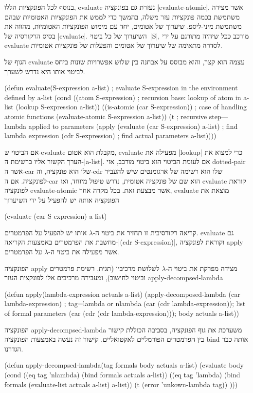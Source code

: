 בנוסף לכל הפונקציות הללו, evaluate נעזרת גם בפונקציה \E|evaluate-atomic|, אשר
מצידה משתמשת בכמה פונקציות עזר משלה, בהמשך כדי לממש את הפונקציות האטומיות שבהם
משתמשת מיני-ליספ. שיערוך של אטומים, יחד עם מימוש הפונקציות האטומיות, מהווה את
בסיס הרקורסיה של \E|evaluate|. השיערוך של כל ביטוי~\E|S|, מורכב ככל שיהיה
מתורגם על ידי evaluate לסדרה מתאימה של שיערוך של אטומים והפעלות של פונקציות
אטומיות.

הגוף של evaluate עצמה הוא קצר, והוא מבוסס על אבחנה בין שלוש אפשרויות שונות ביחס
לביטוי אותו היא נדרש לשערך.

\minipage\textwidth
\begin{KERNEL}
(defun evaluate(S-expression a-list) ; evaluate S-expression in the environment defined by a-list
  (cond ((atom S-expression) ; recursion base: lookup of atom in a-list
          (lookup S-expression a-list))
        ((is-atomic (car S-expression)) ; case of handling atomic functions
          (evaluate-atomic S-expression a-list))
        (t ; recursive step---lambda applied to parameters
          (apply (evaluate (car S-expression) a-list) ; find lambda expression
                  (cdr S-expression) ; find actual parameters
                  a-list))))
\end{KERNEL}
\endminipage

אם הביטוי ש-evaluate מקבלת הוא אטום, evaluate מפעילה את \E|lookup| כדי למצוא את
הערך הקשור אליו ברשימת ה-\E|a-list|. אם לעומת הביטוי הוא ביטוי מורכב, אזי
dotted-pair אשר ה-car שלו הוא פונקציה, וה-cdr שלו הוא רשימה של
ארגומנטים שיש להעביר לפונקציה. אם ה-car הוא שם של פונקציה אטומית, נדרש טיפול
מיוחד, ואז evaluate קוראת לפונקציה evaluate-atomic אשר מבצעת זאת.
בכל מקרה אחר, evaluate מוצאת את הפונקציה אותה יש להפעיל על ידי השיערוך
\begin{LISP}
(evaluate (car S-expression) a-list)
\end{LISP}
קריאה רקורסיבית זו תחזיר את ביטוי ה-$λ$ אותו יש להפעיל על הפרמטרים. evaluate
גם מחשבת את הפרמטרים באמצעות הקריאה-\T|(cdr S-expression)|, וקוראת לפונקציה
apply אשר מפעילה את ביטוי ה-$λ$ על הפרמטרים.

הפונקציה apply מצידה מפרקת את ביטוי ה-$λ$ לשלושת מרכיביו (תגית, רשימת פרמטרים
וביטוי לחישוב), ומעבירה מרכיבים אלו לפונקצית העזר apply-decompsed-lambda
\begin{KERNEL}
(defun apply(lambda-expression actuals a-list)
  (apply-decomposed-lambda
    (car lambda-expression) ; tag=lambda or nlambda
    (car (cdr lambda-expression)); list of formal parameters
    (car (cdr (cdr lambda-expression))); body
    actuals
    a-list))
\end{KERNEL}
הפונקציה apply-decompsed-lambda משערכת את גוף הפונקציה, בסביבה הכוללת קישור בין
הפרמטרים הפורמליים לאקטואליים. קישור זה נעשה באמצעות הפונקציה bind אותה כבר
הגדרנו.
\begin{KERNEL}
(defun apply-decompsed-lambda(tag formals body actuals a-list)
  (evaluate body
    (cond ((eq tag 'nlambda) (bind formals actuals a-list))
          ((eq tag 'lambda) (bind formals (evaluate-list actuals a-list) a-list))
          (t (error 'unkown-lambda tag))
)))
\end{KERNEL}

